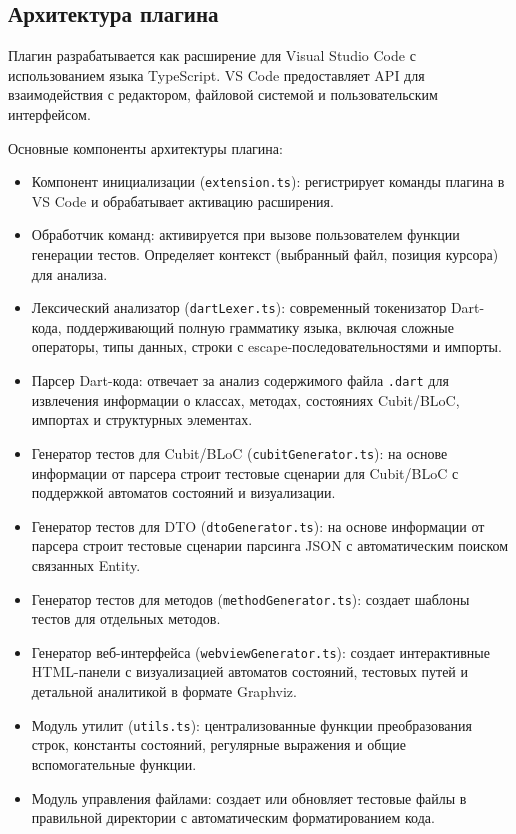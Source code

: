 \documentclass[14pt, russian]{scrartcl}
\begin{document}
\subsection{Архитектура плагина}
Плагин разрабатывается как расширение для Visual Studio Code с использованием языка TypeScript. VS Code предоставляет API для взаимодействия с редактором, файловой системой и пользовательским интерфейсом.

Основные компоненты архитектуры плагина:
\begin{itemize}
    \item Компонент инициализации (\texttt{extension.ts}): регистрирует команды плагина в VS Code и обрабатывает активацию расширения.
    \item Обработчик команд: активируется при вызове пользователем функции генерации тестов. Определяет контекст (выбранный файл, позиция курсора) для анализа.
    \item Лексический анализатор (\texttt{dartLexer.ts}): современный токенизатор Dart-кода, поддерживающий полную грамматику языка, включая сложные операторы, типы данных, строки с escape-последовательностями и импорты.
    \item Парсер Dart-кода: отвечает за анализ содержимого файла \texttt{.dart} для извлечения информации о классах, методах, состояниях Cubit/BLoC, импортах и структурных элементах.
    \item Генератор тестов для Cubit/BLoC (\texttt{cubitGenerator.ts}): на основе информации от парсера строит тестовые сценарии для Cubit/BLoC с поддержкой автоматов состояний и визуализации.
    \item Генератор тестов для DTO (\texttt{dtoGenerator.ts}): на основе информации от парсера строит тестовые сценарии парсинга JSON с автоматическим поиском связанных Entity.
    \item Генератор тестов для методов (\texttt{methodGenerator.ts}): создает шаблоны тестов для отдельных методов.
    \item Генератор веб-интерфейса (\texttt{webviewGenerator.ts}): создает интерактивные HTML-панели с визуализацией автоматов состояний, тестовых путей и детальной аналитикой в формате Graphviz.
    \item Модуль утилит (\texttt{utils.ts}): централизованные функции преобразования строк, константы состояний, регулярные выражения и общие вспомогательные функции.
    \item Модуль управления файлами: создает или обновляет тестовые файлы в правильной директории с автоматическим форматированием кода.
\end{itemize}
\end{document}

